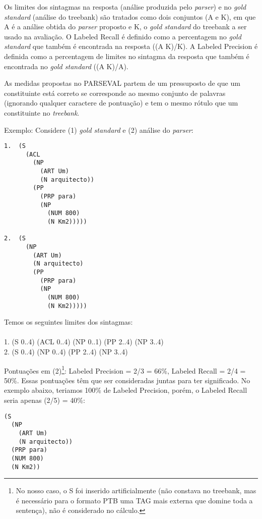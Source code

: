 Os limites dos sintagmas na resposta (análise produzida pelo \emph{parser}) e no \emph{gold standard} (análise do treebank) são tratados como dois conjuntos (A e K), em que A é a análise obtida do \emph{parser} proposto e K, o \emph{gold standard} do treebank a ser usado na avaliação. O Labeled Recall
é definido como a percentagem no \emph{gold standard} que também é encontrada na resposta ((A K)/K). A Labeled Precision é definida como a percentagem de limites no sintagma da resposta que também é encontrada no \emph{gold standard} ((A K)/A).

As medidas propostas no PARSEVAL partem de um pressuposto de que um constituinte está correto se corresponde ao mesmo conjunto de palavras (ignorando qualquer caractere de pontuação) e tem o mesmo rótulo que um constituinte no \emph{treebank}.

Exemplo: Considere (1) \emph{gold standard} e (2) análise do \emph{parser}:

\begin{center}
\footnotesize
\begin{verbatim}
1.  (S
      (ACL
        (NP
          (ART Um)
          (N arquitecto))
        (PP
          (PRP para)
          (NP
            (NUM 800)
            (N Km2)))))

2.  (S
      (NP
        (ART Um)
        (N arquitecto)
        (PP
          (PRP para)
          (NP
            (NUM 800)
            (N Km2)))))
\end{verbatim}
\end{center}

Temos os seguintes limites dos sintagmas:\\ \\
1. (S 0..4) (ACL 0..4) (NP 0..1) (PP 2..4) (NP 3..4)\\
2. (S 0..4) (NP 0..4) (PP 2..4) (NP 3..4)

Pontuações em (2)\footnote{No nosso caso, o S foi inserido artificialmente (não constava no treebank, mas é necessário para o formato PTB uma TAG mais externa que domine toda a sentença), não é considerado no cálculo.}: Labeled Precision = 2/3 = 66{\%}, Labeled Recall = 2/4 = 50{\%}. Essas pontuações têm que ser consideradas juntas para ter significado. 
No exemplo abaixo, teriamos 100{\%} de Labeled Precision, porém, o Labeled Recall seria apenas (2/5) = 40{\%}:

\begin{center}
\footnotesize
\begin{verbatim}
(S 
  (NP 
    (ART Um) 
    (N arquitecto)) 
  (PRP para) 
  (NUM 800) 
  (N Km2)) 
\end{verbatim}
\end{center}
